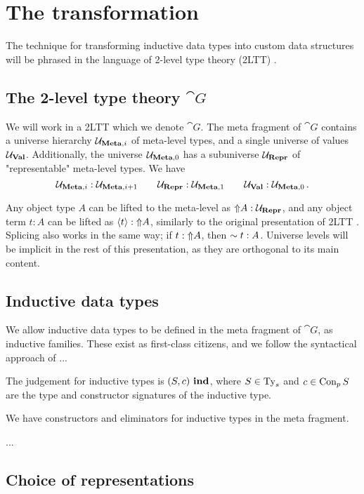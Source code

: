 \section{The transformation}\label{sec:prelim}

The technique for transforming inductive data types into custom data structures
will be phrased in the language of 2-level type theory (2LTT)
\cite{Kovacs2022-vb}.

\subsection{The 2-level type theory $\cat{G}$}

We will work in a 2LTT which we denote $\cat{G}$. The meta fragment of
$\cat{G}$ contains a universe hierarchy ${\mathcal{U}_{{\textbf{Meta},i}}}$ of meta-level
types, and a single universe of values ${{\mathcal{U}_{{\textbf{Val}}}}}$. Additionally, the universe
${\mathcal{U}_{{\textbf{Meta},0}}}$ has a subuniverse ${{\mathcal{U}_{{\textbf{Repr}}}}}$ of "representable" meta-level
types. We have
\[
  {\mathcal{U}_{{\textbf{Meta},i}}} : {\mathcal{U}_{{\textbf{Meta},i+1}}} \qquad {{\mathcal{U}_{{\textbf{Repr}}}}} : {\mathcal{U}_{{\textbf{Meta},1}}} \qquad {{\mathcal{U}_{{\textbf{Val}}}}} : {\mathcal{U}_{{\textbf{Meta},0}}} \,.
\]

Any object type $A$ can be lifted to the meta-level as $\text{$\Uparrow$}{A} : {{\mathcal{U}_{{\textbf{Repr}}}}}$, and any
object term $t : A$ can be lifted as $\langle{t}\rangle : \text{$\Uparrow$}{A}$, similarly to the
original presentation of 2LTT \cite{Kovacs2022-vb}. Splicing also works in the
same way; if $t : \text{$\Uparrow$}{A}$, then $\sim{t} : A$. Universe levels will be
implicit in the rest of this presentation, as they are orthogonal to its main
content.

\subsection{Inductive data types}

We allow inductive data types to be defined in the meta fragment of $\cat{G}$,
as inductive families. These exist as first-class citizens, and we follow the
syntactical approach of \cite{Kaposi2020-is} ...

The judgement for inductive types is ${(S, c)} \ \textbf{ind}$, where $S \in \text{Ty}_s$ and
$c \in \text{Con}_p \, S$ are the type and constructor signatures of the inductive
type.

We have constructors and eliminators for inductive types in the meta fragment.

...

\subsection{Choice of representations}

